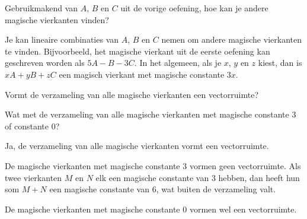 \documentclass{ximera}
\begin{document}
\begin{exercise}
    Gebruikmakend van \(A\), \(B\) en \(C\) uit de vorige oefening, hoe kan je andere magische vierkanten vinden?
    \begin{oplossing}
        Je kan lineaire combinaties van \(A\), \(B\) en \(C\) nemen om andere magische vierkanten te vinden.
        Bijvoorbeeld, het magische vierkant uit de eerste oefening kan geschreven worden als \(5A - B - 3C\).
        In het algemeen, als je \(x\), \(y\) en \(z\) kiest, dan is \(xA + yB + zC\) een magisch vierkant met magische constante \(3x\).
    \end{oplossing}
\end{exercise}

\begin{exercise}
    \begin{question}
        Vormt de verzameling van alle magische vierkanten een vectorruimte?
    \end{question}
    \begin{question}
        Wat met de verzameling van alle magische vierkanten met magische constante \(3\) of constante \(0\)?
    \end{question}
    \begin{oplossing}
        Ja, de verzameling van alle magische vierkanten vormt een vectorruimte.

        De magische vierkanten met magische constante \(3\) vormen geen vectorruimte.
        Als twee vierkanten \(M\) en \(N\) elk een magische constante van \(3\) hebben, dan heeft hun som \(M + N\) een magische constante van \(6\), wat buiten de verzameling valt.

        De magische vierkanten met magische constante \(0\) vormen wel een vectorruimte.
    \end{oplossing}
\end{exercise}
\end{document}
